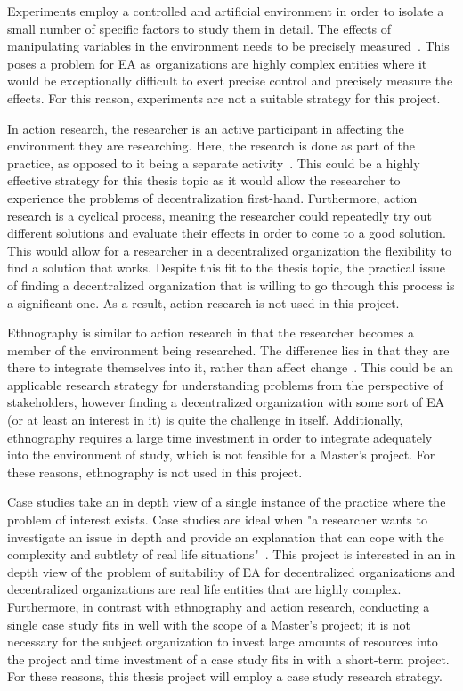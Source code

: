 Experiments employ a controlled and artificial environment in order to isolate a small number of specific factors to study them in detail. The effects of manipulating variables in the environment needs to be precisely measured~\cite{denscombe2010good}. This poses a problem for EA as organizations are highly complex entities where it would be exceptionally difficult to exert precise control and precisely measure the effects. For this reason, experiments are not a suitable strategy for this project. 

In action research, the researcher is an active participant in affecting the environment they are researching. Here, the research is done as part of the practice, as opposed to it being a separate activity~\cite{denscombe2010good}. This could be a highly effective strategy for this thesis topic as it would allow the researcher to experience the problems of decentralization first-hand. Furthermore, action research is a cyclical process, meaning the researcher could repeatedly try out different solutions and evaluate their effects in order to come to a good solution. This would allow for a researcher in a decentralized organization the flexibility to find a solution that works. Despite this fit to the thesis topic, the practical issue of finding a decentralized organization that is willing to go through this process is a significant one. As a result, action research is not used in this project. 

Ethnography is similar to action research in that the researcher becomes a member of the environment being researched. The difference lies in that they are there to integrate themselves into it, rather than affect change~\cite{denscombe2010good}. This could be an applicable research strategy for understanding problems from the perspective of stakeholders, however finding a decentralized organization with some sort of EA (or at least an interest in it) is quite the challenge in itself. Additionally, ethnography requires a large time investment in order to integrate adequately into the environment of study, which is not feasible for a Master's project. For these reasons, ethnography is not used in this project. 

Case studies take an in depth view of a single instance of the practice where the problem of interest exists. Case studies are ideal when "a researcher wants to investigate an issue in depth and provide an explanation that can cope with the complexity and subtlety of real life situations"~\cite{denscombe2010good}. This project is interested in an in depth view of the problem of suitability of EA for decentralized organizations and decentralized organizations are real life entities that are highly complex. Furthermore, in contrast with ethnography and action research, conducting a single case study fits in well with the scope of a Master's project; it is not necessary for the subject organization to invest large amounts of resources into the project and time investment of a case study fits in with a short-term project. For these reasons, this thesis project will employ a case study research strategy.  

